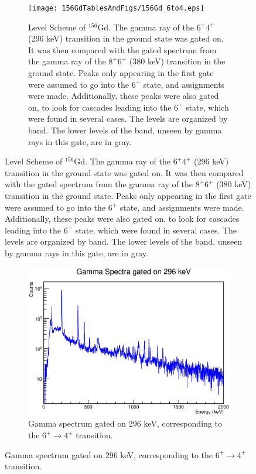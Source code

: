 \begin{landscape}
\begin{figure}[!]
    \centering
    \begin{subfigure}{1.4\textwidth}
    \texttt{[image: 156GdTablesAndFigs/156Gd\_6to4.eps]}
    \caption{\label{fig:156_6to4level}Level Scheme of $^{156}$Gd. The gamma ray of the $6^+$\rightarrow$4^+$ (296 keV) transition in the ground state was gated on. It was then compared with the gated spectrum from the gamma ray of the $8^+$\rightarrow$6^+$ (380 keV) transition in the ground state. Peaks only appearing in the first gate were assumed to go into the $6^+$ state, and assignments were made. Additionally, these peaks were also gated on, to look for cascades leading into the $6^+$ state, which were found in several cases. The levels are organized by band. The lower levels of the band, unseen by gamma rays in this gate, are in gray.}
    \end{subfigure}
    \label{fig:156_6to4}
    \end{figure}
    \begin{figure}
    \ContinuedFloat
    \begin{subfigure}{1.4\textwidth}
    \includegraphics[]{156GdTablesAndFigs/296GateSpectrum.eps}
    \caption{Gamma spectrum gated on 296 keV, corresponding to the $6^+\rightarrow4^+$ transition.}
    \label{fig:156_6to4spec}
    \end{subfigure}
\end{figure}
\end{landscape}